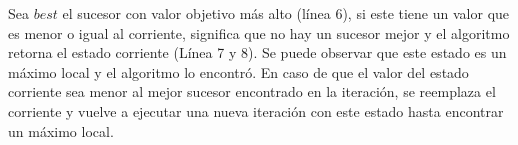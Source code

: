 Sea $best$ el sucesor con valor objetivo más alto (línea 6), si este tiene un valor que es menor o igual al corriente, significa que no hay un sucesor mejor y el algoritmo retorna el estado corriente (Línea 7 y 8). Se puede observar que este estado es un máximo local y el algoritmo lo encontró.
En caso de que el valor del estado corriente sea menor al mejor sucesor encontrado en la iteración, se reemplaza el corriente y vuelve a ejecutar una nueva iteración con este estado hasta encontrar un máximo local. 



